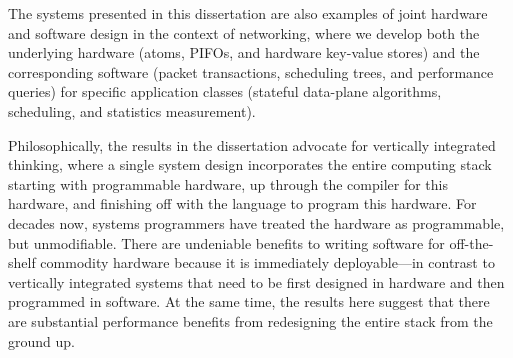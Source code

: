 The systems presented in this dissertation are also examples of joint hardware
and software design in the context of networking, where we develop both the
underlying hardware (atoms, PIFOs, and hardware key-value stores) and the
corresponding software (packet transactions, scheduling trees, and performance
queries) for specific application classes (stateful data-plane algorithms,
scheduling, and statistics measurement).

 Philosophically, the results in the
dissertation advocate for vertically integrated thinking, where a single system
design incorporates the entire computing stack starting with programmable
hardware, up through the compiler for this hardware, and finishing off with the
language to program this hardware. For decades now, systems programmers have
treated the hardware as programmable, but unmodifiable. There are undeniable
benefits to writing software for off-the-shelf commodity hardware because it is
immediately deployable---in contrast to vertically integrated systems that need
to be first designed in hardware and then programmed in software. At the same
time, the results here suggest that there are substantial performance benefits
from redesigning the entire stack from the ground up.
